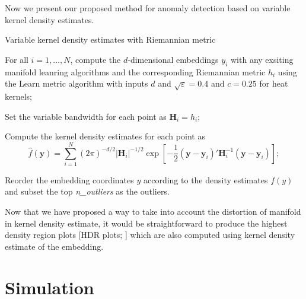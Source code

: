 \documentclass[11pt,a4paper,]{article}
\begin{document}
Now we present our proposed method for anomaly detection based on variable kernel density estimates.

\begin{algorithm}[!htb]
  \caption{Variable kernel density estimates with Riemannian metric}
  \label{alg:vkderm}
  \DontPrintSemicolon
  \SetAlgoLined
  \BlankLine
  \begin{algorithmic}[1]

  \STATE For all $i=1,\ldots,N$, compute the $d$-dimensional embeddings $y_i$ with any exsiting manifold leanring algorithms and the corresponding Riemannian metric $h_i$ using the Learn metric algorithm with inputs $d$ and $\sqrt{\varepsilon} = 0.4$ and $c=0.25$ for heat kernels;

  \STATE Set the variable bandwidth for each point as $\pmb{H}_i = h_i$;

  \STATE Compute the kernel density estimates for each point as
  $$
  \hat{f}(\pmb{y})=\sum\limits_{i=1}^N (2\pi)^{-d/2}|\pmb{H}_i|^{-1/2}\exp\left[-\frac{1}{2}(\pmb{y}-\pmb{y}_i)'\pmb{H}_i^{-1}(\pmb{y}-\pmb{y}_i)\right];
  $$

  \STATE Reorder the embedding coordinates $y$ according to the density estimates $f(y)$ and subset the top \textit{n\_outliers} as the outliers.

  \end{algorithmic}
\end{algorithm}

Now that we have proposed a way to take into account the distortion of manifold in kernel density estimate, it would be straightforward to produce the highest density region plots {[}HDR plots; \textcite{Hyndman1996-lk}{]} which are also computed using kernel density estimate of the embedding.

\hypertarget{simulation}{%
\section{Simulation}\label{simulation}}
\end{document}

